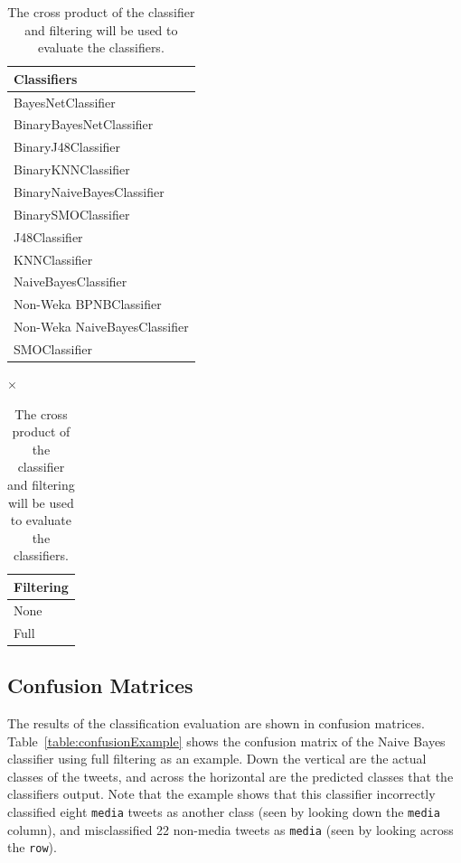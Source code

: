 \documentclass[12pt]{ucthesis}
\begin{document}
\begin{table}[H]
   \begin{center}
      \begin{tabular}{|l|}
         \hline
            \textbf{Classifiers}
         \tabularnewline\hline
            BayesNetClassifier
         \tabularnewline\hline
            BinaryBayesNetClassifier
         \tabularnewline\hline
            BinaryJ48Classifier
         \tabularnewline\hline
            BinaryKNNClassifier
         \tabularnewline\hline
            BinaryNaiveBayesClassifier
         \tabularnewline\hline
            BinarySMOClassifier
         \tabularnewline\hline
            J48Classifier
         \tabularnewline\hline
            KNNClassifier
         \tabularnewline\hline
            NaiveBayesClassifier
         \tabularnewline\hline
            Non-Weka BPNBClassifier
         \tabularnewline\hline
            Non-Weka NaiveBayesClassifier
         \tabularnewline\hline
            SMOClassifier
         \tabularnewline\hline
      \end{tabular}
      {
         \Huge
         $\times$
      }
      \begin{tabular}{|l|}
         \hline
            \textbf{Filtering}
         \tabularnewline\hline
            None
         \tabularnewline\hline
            Full
         \tabularnewline\hline
      \end{tabular}
      \caption[Classifier Evaluation Combinations]{The cross product of the classifier and filtering will be used to evaluate the classifiers.}
      \label{table:classifierEvaluationSpace}
   \end{center}
\end{table}

\subsection{Confusion Matrices}
\label{class-evaluation-confusion}
The results of the classification evaluation are shown in confusion matrices.
Table~\ref{table:confusionExample} shows the confusion matrix of the Naive Bayes classifier using full filtering as an example.
Down the vertical are the actual classes of the tweets, and across the horizontal are the predicted classes that the classifiers output.
Note that the example shows that this classifier incorrectly classified eight \texttt{media} tweets as another class (seen by looking down the \texttt{media} column),
and misclassified 22 non-media tweets as \texttt{media} (seen by looking across the \texttt{row}).
\end{document}
